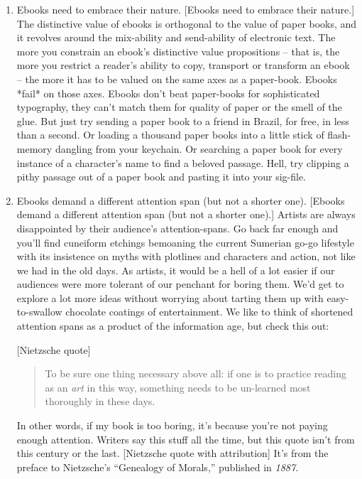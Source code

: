 \begin{enumerate}
\item
  Ebooks need to embrace their nature. [Ebooks need to embrace their
  nature.] The distinctive value of ebooks is orthogonal to the value
  of paper books, and it revolves around the mix-ability and
  send-ability of electronic text. The more you constrain an ebook's
  distinctive value propositions -- that is, the more you restrict a
  reader's ability to copy, transport or transform an ebook -- the
  more it has to be valued on the same axes as a paper-book. Ebooks
  *fail* on those axes. Ebooks don't beat paper-books for
  sophisticated typography, they can't match them for quality of
  paper or the smell of the glue. But just try sending a paper book
  to a friend in Brazil, for free, in less than a second. Or loading
  a thousand paper books into a little stick of flash-memory dangling
  from your keychain. Or searching a paper book for every instance of
  a character's name to find a beloved passage. Hell, try clipping a
  pithy passage out of a paper book and pasting it into your
  sig-file.
\item
  Ebooks demand a different attention span (but not a shorter one).
  [Ebooks demand a different attention span (but not a shorter one).]
  Artists are always disappointed by their audience's
  attention-spans. Go back far enough and you'll find cuneiform
  etchings bemoaning the current Sumerian go-go lifestyle with its
  insistence on myths with plotlines and characters and action, not
  like we had in the old days. As artists, it would be a hell of a
  lot easier if our audiences were more tolerant of our penchant for
  boring them. We'd get to explore a lot more ideas without worrying
  about tarting them up with easy-to-swallow chocolate coatings of
  entertainment. We like to think of shortened attention spans as a
  product of the information age, but check this out:
  
  [Nietzsche quote]
  
  \begin{quote}
    To be sure one thing necessary above all: if one is to practice
    reading as an \emph{art} in this way, something needs to be
    un-learned most thoroughly in these days.
  \end{quote}

  In other words, if my book is too boring, it's because you're not
  paying enough attention. Writers say this stuff all the time, but
  this quote isn't from this century or the last. [Nietzsche quote
  with attribution] It's from the preface to Nietzsche's ``Genealogy
  of Morals,'' published in \emph{1887.}
  

\end{enumerate}
